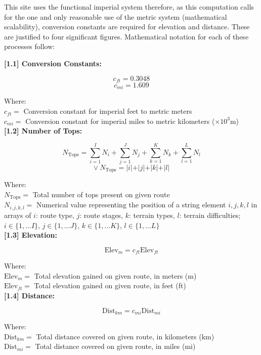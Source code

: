 \documentclass[11pt, english]{article}
\begin{document}
	This site uses the functional imperial system therefore, as this computation calls for the one and only reasonable use of the metric system (mathematical scalability), conversion constants are required for elevation and distance. These are justified to four significant figures. Mathematical notation for each of these processes follow:

\newpage

	\textbf{[1.1] Conversion Constants:}

	$$c_{ft}=0.3048$$
	$$c_{mi}=1.609$$

	Where:\\
	$c_{ft}=$ Conversion constant for imperial feet to metric meters\\
	$c_{mi}=$ Conversion constant for imperial miles to metric kilometers ($\times10^{3}$m)\\

	\textbf{[1.2] Number of Tops:}

	$$N_{\mathrm{Tops}}=\sum^{I}_{i=1}N_{i}+\sum^{J}_{j=1}N_{j}+\sum^{K}_{k=1}N_{k}+\sum^{L}_{l=1}N_{l}$$
	$$\lor\ N_{\mathrm{Tops}}=\vert i\vert + \vert j\vert + \vert k\vert + \vert l\vert$$

	Where:\\
	$N_{\mathrm{Tops}}=$ Total number of tops present on given route\\
	$N_{i,j,k,l}=$ Numerical value representing the position of a string element $i,j,k,l$ in arrays of $i$: route type, $j$: route stages, $k$: terrain types, $l$: terrain difficulties; $i\in\{1,...I\}$, $j\in\{1,...J\}$, $k\in\{1,...K\}$, $l\in\{1,...L\}$\\

	\textbf{[1.3] Elevation:}

	$$\mathrm{Elev}_{m}=c_{ft}\mathrm{Elev}_{ft}$$

	Where:\\
	$\mathrm{Elev}_{m}=$ Total elevation gained on given route, in meters (m)\\
	$\mathrm{Elev}_{ft}=$ Total elevation gained on given route, in feet (ft)\\

	\textbf{[1.4] Distance:}

	$$\mathrm{Dist}_{km}=c_{mi}\mathrm{Dist}_{mi}$$

	Where:\\
	$\mathrm{Dist}_{km}=$ Total distance covered on given route, in kilometers (km)\\
	$\mathrm{Dist}_{mi}=$ Total distance covered on given route, in miles (mi)\\
\end{document}
